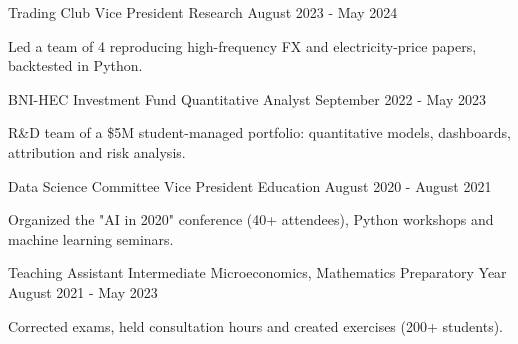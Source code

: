 \begin{cventries}
  \cvrow
    {Trading Club}
    {Vice President Research}
    {August 2023 - May 2024}
    {
      \begin{cvitems}
        \item{Led a team of 4 reproducing high-frequency FX and electricity-price papers, backtested in Python.}
      \end{cvitems}
    }
  \cvrow
    {BNI-HEC Investment Fund}
    {Quantitative Analyst}
    {September 2022 - May 2023}
    {
      \begin{cvitems}
        \item{R\&D team of a \$5M student-managed portfolio: quantitative models, dashboards, attribution and risk analysis.}
      \end{cvitems}
    }
  \cvrow
    {Data Science Committee}
    {Vice President Education}
    {August 2020 - August 2021}
    {
      \begin{cvitems}
        \item{Organized the "AI in 2020" conference (40+ attendees), Python workshops and machine learning seminars.}
      \end{cvitems}
    }
  \cvrow
    {Teaching Assistant}
    {Intermediate Microeconomics, Mathematics Preparatory Year}
    {August 2021 - May 2023}
    {
      \begin{cvitems}
        \item{Corrected exams, held consultation hours and created exercises (200+ students).}
      \end{cvitems}
    }
\end{cventries}
